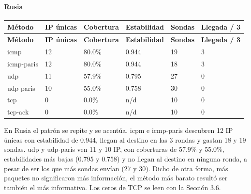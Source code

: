 \paragraph{Rusia}
\begingroup
\fontsize{9}{11}\selectfont
\addtocounter{table}{-1}
\begin{longtable}{p{3.1cm}p{1.9cm}p{2.1cm}p{2.1cm}p{1.8cm}p{2.1cm}}
\toprule
\textbf{Método} & \textbf{IP únicas} & \textbf{Cobertura} & \textbf{Estabilidad} & \textbf{Sondas} & \textbf{Llegada / 3} \\ \midrule
\endfirsthead
\toprule
\textbf{Método} & \textbf{IP únicas} & \textbf{Cobertura} & \textbf{Estabilidad} & \textbf{Sondas} & \textbf{Llegada / 3} \\ \midrule
\endhead
icmp & 12 & 80.0\% & 0.944 & 19 & 3 \\
icmp-paris & 12 & 80.0\% & 0.944 & 18 & 3 \\
udp & 11 & 57.9\% & 0.795 & 27 & 0 \\
udp-paris & 10 & 55.0\% & 0.758 & 30 & 0 \\
tcp & 0 & 0.0\% & n/d & 10 & 0 \\
tcp-ack & 0 & 0.0\% & n/d & 10 & 0 \\
\bottomrule
\end{longtable}
\endgroup

En Rusia el patrón se repite y se acentúa. icpm e icmp-paris descubren 12 IP únicas con estabilidad de 0.944, llegan al destino en las 3 rondas y gastan 18 y 19 sondas. udp y udp-paris ven 11 y 10 IP, con coberturas de 57.9\% y 55.0\%, estabilidades más bajas (0.795 y 0.758) y no llegan al destino en ninguna ronda, a pesar de ser los que más sondas envían (27 y 30). Dicho de otra forma, más paquetes no significaron más información, el método más barato resultó ser también el más informativo. Los ceros de TCP se leen con la Sección 3.6.


